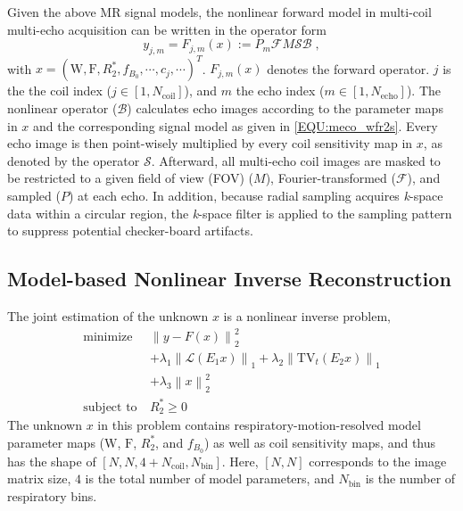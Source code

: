 \documentclass[journal,twoside,web]{ieeecolor}
\newcommand*{\norm}[1]{\left\lVert#1\right\rVert}
\begin{document}
Given the above MR signal models, the nonlinear forward model in multi-coil multi-echo acquisition 
can be written in the operator form 
\begin{equation} \label{EQU:op_fwd}
y_{j,m} = F_{j,m} (x) := P_m \mathcal{F} M \mathcal{S} \mathcal{B} \; ,
\end{equation}
with $x = (\text{W}, \text{F}, R_2^*, f_{B_0}, \cdots, c_j, \cdots)^T$. 
$F_{j,m} (x)$ denotes the forward operator.
$j$ is the the coil index ($j \in [1,N_\text{coil}]$), 
and $m$ the echo index ($m \in [1, N_\text{echo}]$). 
The nonlinear operator ($\mathcal{B}$) calculates echo images 
according to the parameter maps in $x$ and 
the corresponding signal model as given in \cref{EQU:meco_wfr2s}. 
Every echo image is then point-wisely multiplied by every coil sensitivity map in $x$, 
as denoted by the operator $\mathcal{S}$. 
Afterward, all multi-echo coil images are masked to be restricted to a given
field of view (FOV) ($M$), Fourier-transformed ($\mathcal{F}$), and sampled ($P$) at each echo.
In addition, because radial sampling acquires \textit{k}-space data within a circular region, 
the \textit{k}-space filter \cite{pruessmann_2001_gsense}
is applied to the sampling pattern to suppress potential checker-board artifacts.

\subsection{Model-based Nonlinear Inverse Reconstruction}

The joint estimation of the unknown $x$ is a nonlinear inverse problem,
\begin{equation} \label{EQU:obj_func}
\begin{aligned}
\text{minimize}~& \norm{y - F(x)}_2^2 \\
& + \lambda_1 \norm{\mathcal{L} (E_1 x)}_1 + \lambda_2 \norm{\text{TV}_t (E_2 x)}_1 \\
& + \lambda_3 \norm{x}_2^2 \\
\text{subject to}~& {R_2^*} \geq 0
\end{aligned}
\end{equation}
The unknown $x$ in this problem contains respiratory-motion-resolved 
model parameter maps ($\text{W}$,  $\text{F}$, $R_2^*$, and $f_{B_0}$) 
as well as coil sensitivity maps, and thus has the shape of 
$[N, N, 4 + N_\text{coil}, N_\text{bin}]$. 
Here, $[N, N]$ corresponds to the image matrix size, 
$4$ is the total number of model parameters, 
and $N_\text{bin}$ is the number of respiratory bins.
\end{document}
